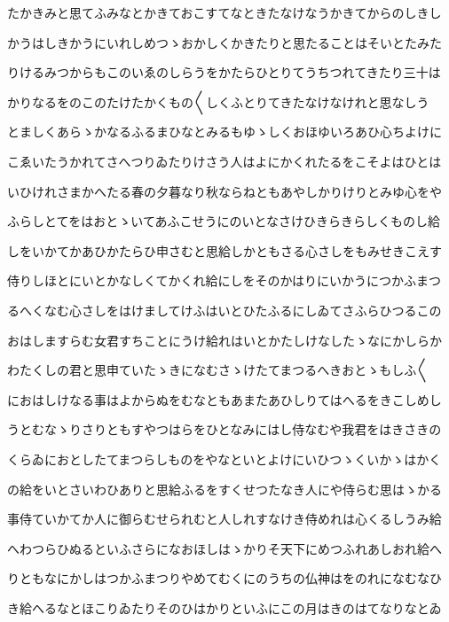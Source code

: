 \documentclass[a4paper,11pt,landscape]{ltjtarticle}
\begin{document}
たかきみと思てふみなとかきておこすてなときたなけなうかきてからのしきし
\par\medskip
かうはしきかうにいれしめつゝおかしくかきたりと思たることはそいとたみた
\par\medskip
りけるみつからもこのいゑのしらうをかたらひとりてうちつれてきたり三十は
\par\medskip
かりなるをのこのたけたかくもの〱しくふとりてきたなけなけれと思なしう
\par\medskip
とましくあらゝかなるふるまひなとみるもゆゝしくおほゆいろあひ心ちよけに
\par\medskip
こゑいたうかれてさへつりゐたりけさう人はよにかくれたるをこそよはひとは
\par\medskip
いひけれさまかへたる春の夕暮なり秋ならねともあやしかりけりとみゆ心をや
\par\medskip
ふらしとてをはおとゝいてあふこせうにのいとなさけひきらきらしくものし給
\par\medskip
しをいかてかあひかたらひ申さむと思給しかともさる心さしをもみせきこえす
\par\medskip
侍りしほとにいとかなしくてかくれ給にしをそのかはりにいかうにつかふまつ
\par\medskip
るへくなむ心さしをはけましてけふはいとひたふるにしゐてさふらひつるこの
\par\medskip
おはしますらむ女君すちことにうけ給れはいとかたしけなしたゝなにかしらか
\par\medskip
わたくしの君と思申ていたゝきになむさゝけたてまつるへきおとゝもしふ〱
\par\medskip
におはしけなる事はよからぬをむなともあまたあひしりてはへるをきこしめし
\par\medskip
うとむなゝりさりともすやつはらをひとなみにはし侍なむや我君をはきさきの
\par\medskip
くらゐにおとしたてまつらしものをやなといとよけにいひつゝくいかゝはかく
\par\medskip
の給をいとさいわひありと思給ふるをすくせつたなき人にや侍らむ思はゝかる
\par\medskip
事侍ていかてか人に御らむせられむと人しれすなけき侍めれは心くるしうみ給
\par\medskip
へわつらひぬるといふさらになおほしはゝかりそ天下にめつふれあしおれ給へ
\par\medskip
りともなにかしはつかふまつりやめてむくにのうちの仏神はをのれになむなひ
\par\medskip
き給へるなとほこりゐたりそのひはかりといふにこの月はきのはてなりなとゐ
\par\medskip
\end{document}
